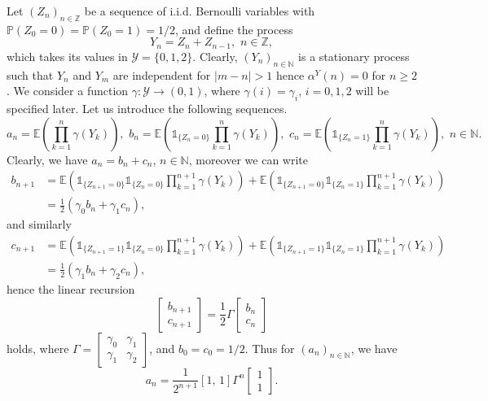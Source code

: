 \documentclass[a4paper,10pt]{article}
\newcommand{\N}{\mathbb{N}}
\newcommand{\Z}{\mathbb{Z}}
\newcommand{\Y}{\mathcal{Y}}
\renewcommand{\P}{\mathbb{P}}
\newcommand{\E}{\mathbb{E}}
\newcommand{\ind}{\mathds{1}}
\newcommand{\ga}{\gamma}
\begin{document}
Let $(Z_n)_{n\in\Z}$ be a sequence of i.i.d. Bernoulli variables with $\P (Z_0=0)=\P (Z_0=1)=1/2$, and define the process 
$$
Y_n = Z_n + Z_{n-1},\,\, n\in\Z,
$$ 
which takes its values in $\Y=\{0,1,2\}$. Clearly, $(Y_n)_{n\in\N}$ is a stationary process such that $Y_n$ and $Y_m$ are independent for $|m-n|>1$ hence $\alpha^Y (n)=0$ for $n\ge 2$. We consider a function $\ga:\Y\to (0,1)$, where $\ga (i)=\ga_i$, $i=0,1,2$ will be specified later.
Let us introduce the following sequences. 
\begin{equation}\label{eq:anbncn}
	a_n = \E\left(\prod_{k=1}^{n}\ga (Y_k)\right),\,\,
	b_n = \E\left(\ind_{\{Z_n=0\}}\prod_{k=1}^{n}\ga (Y_k)\right),\,\,
	c_n = \E\left(\ind_{\{Z_n=1\}}\prod_{k=1}^{n}\ga (Y_k)\right),\,\, n\in\N.
\end{equation}
Clearly, we have $a_n=b_n+c_n$, $n\in\N$, moreover we can write
\begin{align*}
 b_{n+1} &= \E\left(\ind_{\{Z_{n+1}=0\}}\ind_{\{Z_n=0\}}\prod_{k=1}^{n+1}\ga (Y_k)\right) + \E\left(\ind_{\{Z_{n+1}=0\}}\ind_{\{Z_n=1\}}\prod_{k=1}^{n+1}\ga (Y_k)\right) \\
 &=\frac{1}{2}(\ga_0 b_n+\ga_1 c_n),
\end{align*}
and similarly
\begin{align*}
c_{n+1} &= \E\left(\ind_{\{Z_{n+1}=1\}}\ind_{\{Z_n=0\}}\prod_{k=1}^{n+1}\ga (Y_k)\right) + \E\left(\ind_{\{Z_{n+1}=1\}}\ind_{\{Z_n=1\}}\prod_{k=1}^{n+1}\ga (Y_k)\right) \\
&=\frac{1}{2}(\ga_1 b_n+\ga_2 c_n),
\end{align*}
hence the linear recursion
\begin{equation}\label{eq:rec_abc}
\left[\begin{array}{c}
b_{n+1}\\
c_{n+1}
\end{array}\right] = \frac{1}{2}
\Gamma
\left[\begin{array}{c}
b_{n}\\
c_{n}
\end{array}\right]
\end{equation}
holds, where $\Gamma=\left[
\begin{array}{cc}
\ga_0 & \ga_1 \\
\ga_1 & \ga_2
\end{array}
\right]$, and $b_0=c_0=1/2$. Thus for $(a_n)_{n\in\N}$, we have
$$
a_n = \frac{1}{2^{n+1}}[1,\, 1]\Gamma^n\left[\begin{array}{c}
1\\
1
\end{array}\right].
$$
\end{document}
